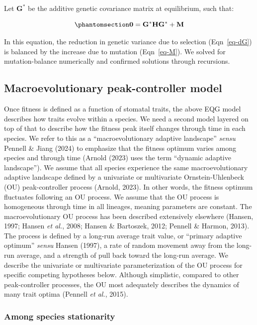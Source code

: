 \documentclass[
  letterpaper,
  DIV=11,
  numbers=noendperiod]{scrartcl}
\begin{document}
Let \(\mathbf{G}^*\) be the additive genetic covariance matrix at
equilibrium, such that:

\begin{equation}\phantomsection\label{eq-Gstar}{\mathbf{0} = \mathbf{G}^*\mathbf{H}\mathbf{G}^* + \mathbf{M}}\end{equation}

In this equation, the reduction in genetic variance due to selection
(Eqn~\ref{eq-dG}) is balanced by the increase due to mutation
(Eqn~\ref{eq-M}). We solved for mutation-balance numerically and
confirmed solutions through recursions.

\subsection{Macroevolutionary peak-controller
model}\label{macroevolutionary-peak-controller-model}

Once fitness is defined as a function of stomatal traits, the above EQG
model describes how traits evolve within a species. We need a second
model layered on top of that to describe how the fitness peak itself
changes through time in each species. We refer to this as a
``macroevolutionary adaptive landscape'' \emph{sensu} Pennell \& Jiang
(2024) to emphasize that the fitness optimum varies among species and
through time (Arnold (2023) uses the term ``dynamic adaptive
landscape''). We assume that all species experience the same
macroevolutionary adaptive landscape defined by a univariate or
multivariate Ornstein-Uhlenbeck (OU) peak-controller process (Arnold,
2023). In other words, the fitness optimum fluctuates following an OU
process. We assume that the OU process is homogeneous through time in
all lineages, meaning parameters are constant. The macroevolutionary OU
process has been described extensively elsewhere (Hansen, 1997; Hansen
\emph{et al.}, 2008; Hansen \& Bartoszek, 2012; Pennell \& Harmon,
2013). The process is defined by a long-run average trait value, or
``primary adaptive optimum'' \emph{sensu} Hansen (1997), a rate of
random movement away from the long-run average, and a strength of pull
back toward the long-run average. We describe the univariate or
multivariate parameterization of the OU process for specific competing
hypotheses below. Although simplistic, compared to other peak-controller
processes, the OU most adequately describes the dynamics of many trait
optima (Pennell \emph{et al.}, 2015).

\subsubsection{Among species
stationarity}\label{among-species-stationarity}
\end{document}
